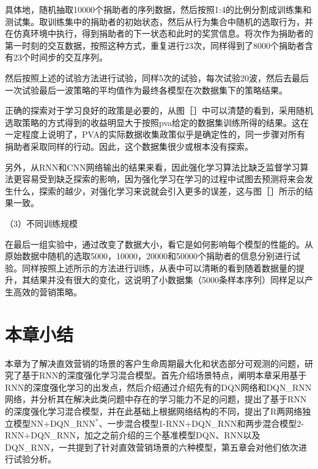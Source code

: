  具体地，随机抽取10000个捐助者的序列数据，然后按照1:4的比例分割成训练集和测试集。取训练集中的捐助者的初始状态，然后从行为集合中随机的选取行为，并在仿真环境中执行，得到捐助者的下一状态和此时的奖赏信息。将次作为捐助者的第一时刻的交互数据，按照这种方式，重复进行23次，同样得到了8000个捐助者含有23个时间步的交互序列。

 然后按照上述的试验方法进行试验，同样5次的试验，每次试验20波，然后去最后一次试验最后一波策略的平均值作为最终各模型在次数据集下的策略结果。

 正确的探索对于学习良好的政策是必要的，从图［］中可以清楚的看到，采用随机选取策略的方式得到的收益明显大于按照pva给定的数据集训练所得的结果。这在一定程度上说明了，PVA的实际数据收集政策似乎是确定性的，同一步骤对所有捐助者采取同样的行动。因此，这个数据集很少或根本没有探索。 

 另外，从RNN和CNN网络输出的结果来看，因此强化学习算法比缺乏监督学习算法更容易受到缺乏探索的影响，因为强化学习在学习的过程中试图去预测将来会发生什么，探索的越少，对强化学习来说就会引入更多的误差，这与图［］所示的结果一致。

（3）不同训练规模

在最后一组实验中，通过改变了数据大小，看它是如何影响每个模型的性能的。从原始数据中随机的选取5000，10000，20000和50000个捐助者的信息分别进行试验。同样按照上述所示的方法进行训练，从表中可以清晰的看到随着数据量的提升，其结果并没有很大的变化，这说明了小数据集（5000条样本序列）同样足以产生高效的营销策略。


\section{本章小结}
本章为了解决直效营销的场景的客户生命周期最大化和状态部分可观测的问题，研究了基于RNN的深度强化学习混合模型。首先介绍场景特点，阐明本章采用基于RNN的深度强化学习的出发点，然后介绍通过介绍先有的DQN网络和DQN\_RNN网络，并分析其在解决此类问题中存在的学习能力不足的问题，提出了基于RNN的深度强化学习混合模型，并在此基础上根据网络结构的不同，提出了R两网络独立模型NN+DQN_RNN$^{*}$、一步混合模型1-RNN+DQN\_RNN和两步混合模型2-RNN+DQN\_RNN，加之之前介绍的三个基准模型DQN、RNN以及DQN_RNN，一共提到了针对直效营销场景的六种模型，第五章会对他们依次进行试验分析。